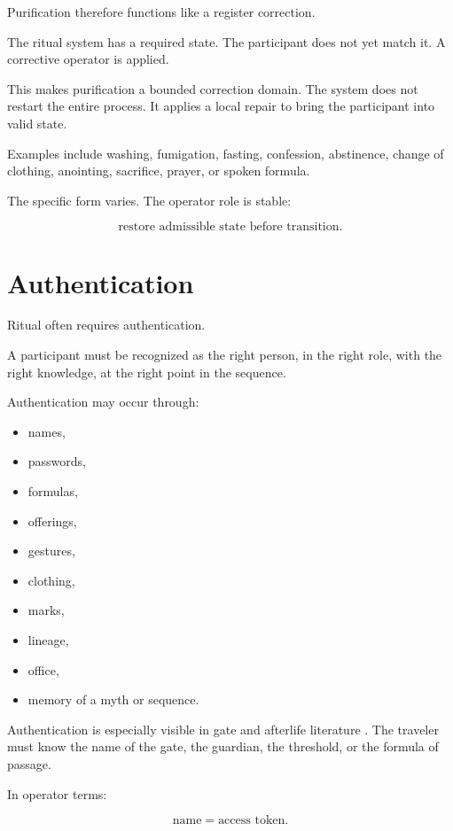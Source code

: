 \documentclass[11pt]{book}
\begin{document}
Purification therefore functions like a register correction.

The ritual system has a required state. The participant does not yet match it. A corrective operator is applied.

This makes purification a bounded correction domain. The system does not restart the entire process. It applies a local repair to bring the participant into valid state.

Examples include washing, fumigation, fasting, confession, abstinence, change of clothing, anointing, sacrifice, prayer, or spoken formula.

The specific form varies. The operator role is stable:

\[
\text{restore admissible state before transition}.
\]

\section{Authentication}

Ritual often requires authentication.

A participant must be recognized as the right person, in the right role, with the right knowledge, at the right point in the sequence.

Authentication may occur through:

\begin{itemize}
    \item names,
    \item passwords,
    \item formulas,
    \item offerings,
    \item gestures,
    \item clothing,
    \item marks,
    \item lineage,
    \item office,
    \item memory of a myth or sequence.
\end{itemize}

Authentication is especially visible in gate and afterlife literature \cite{Allen1974BookDead,Faulkner1972BookDead,Hornung1999BooksAfterlife,Hornung1990BookGates}. The traveler must know the name of the gate, the guardian, the threshold, or the formula of passage.

In operator terms:

\[
\text{name} = \text{access token}.
\]
\end{document}
